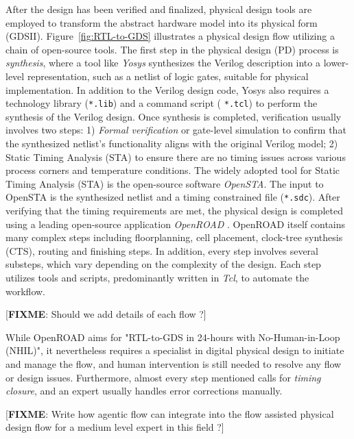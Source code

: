 After the design has been verified and finalized, physical design tools are employed to transform the abstract hardware model into its physical form (GDSII). Figure~\ref{fig:RTL-to-GDS} illustrates a physical design flow utilizing a chain of open-source tools. The first step in the physical design (PD) process is \textit{synthesis}, where a tool like \textit{Yosys} synthesizes the Verilog description into a lower-level representation, such as a netlist of logic gates, suitable for physical implementation. In addition to the Verilog design code, Yosys also requires a technology library (\texttt{*.lib}) and a command script (	\texttt{*.tcl}) to perform the synthesis of the Verilog design. Once synthesis is completed, verification usually involves two steps: 1) 	\textit{Formal verification} or gate-level simulation to confirm that the synthesized netlist's functionality aligns with the original Verilog model; 2) Static Timing Analysis (STA) to ensure there are no timing issues across various process corners and temperature conditions. 
The widely adopted tool for Static Timing Analysis (STA) is the open-source software \textit{OpenSTA}. The input to OpenSTA is the synthesized netlist and a timing constrained file (\texttt{*.sdc}). 
After verifying that the timing requirements are met, the physical design is completed using a leading open-source application \textit{OpenROAD} \cite{ajayi2019toward}\cite{ajayi2019openroad}.
OpenROAD itself contains many complex steps including floorplanning, cell placement, clock-tree synthesis (CTS), routing and finishing steps. In addition, every step involves several substeps, which vary depending on the complexity of the design. Each step utilizes tools and scripts, predominantly written in \textit{Tcl}, to automate the workflow. 

[\textbf{FIXME}: Should we add details of each flow ?]

While OpenROAD aims for "RTL-to-GDS in 24-hours with No-Human-in-Loop (NHIL)", it nevertheless requires a specialist in digital physical design to initiate and manage the flow, and human intervention is still needed to resolve any flow or design issues.
Furthermore, almost every step mentioned calls for \textit{ timing closure}, and an expert usually handles error corrections manually.

[\textbf{FIXME}: Write how agentic flow can integrate into the flow assisted physical design flow for a medium level expert in this field ?]

